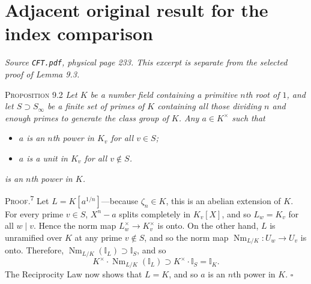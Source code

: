 \documentclass[11pt,a4paper]{article}
\begin{document}
\section*{Adjacent original result for the index comparison}
\noindent\emph{Source \texttt{CFT.pdf}, physical page 233. This excerpt
is separate from the selected proof of Lemma 9.3.}\par\medskip
\noindent\textsc{Proposition 9.2}
\emph{Let $K$ be a number field containing a primitive $n$th root of $1$,
and let $S\supset S_\infty$ be a finite set of primes of $K$ containing
all those dividing $n$ and enough primes to generate the class group of
$K$. Any $a\in K^\times$ such that}
\begin{itemize}
\item[$\diamond$] \emph{$a$ is an $n$th power in $K_v$ for all $v\in S$;}
\item[$\diamond$] \emph{$a$ is a unit in $K_v$ for all $v\notin S$.}
\end{itemize}
\emph{is an $n$th power in $K$.}

\noindent\textsc{Proof.}\textsuperscript{7} Let $L=K[a^{1/n}]$---because
$\zeta_n\in K$, this is an abelian extension of $K$. For every prime
$v\in S$, $X^n-a$ splits completely in $K_v[X]$, and so $L_w=K_v$ for
all $w\mid v$. Hence the norm map $L_w^\times\longrightarrow K_v^\times$
is onto. On the other hand, $L$ is unramified over $K$ at any prime
$v\notin S$, and so the norm map
$\operatorname{Nm}_{L/K}:U_w\longrightarrow U_v$ is onto. Therefore,
$\operatorname{Nm}_{L/K}(\mathbb{I}_L)\supset\mathbb{I}_S$, and so
\[
K^\times\cdot\operatorname{Nm}_{L/K}(\mathbb{I}_L)
\supset K^\times\cdot\mathbb{I}_S=\mathbb{I}_K.
\]
The Reciprocity Law now shows that $L=K$, and so $a$ is an $n$th power
in $K$. \hfill$\square$

\medskip
{}
\end{document}
